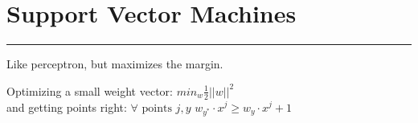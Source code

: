 \section{Support Vector Machines}
\smallskip \hrule height 2pt \smallskip

Like perceptron, but maximizes the margin.  

Optimizing a small weight vector: $\displaystyle min_w \frac{1}{2}||w||^2$ \hfill  \\
and getting points right: $\forall \mbox { points } j, y$  $w_{y^*} \cdot x^j \geq w_y \cdot x^j + 1$